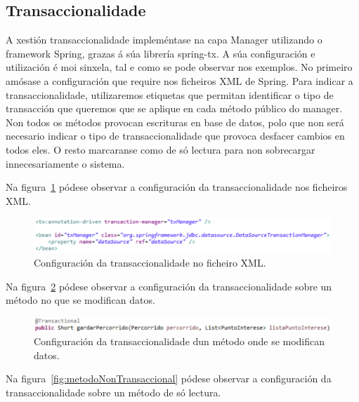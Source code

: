 \subsection{Transaccionalidade}
A xestión transaccionalidade impleméntase na capa Manager utilizando o framework Spring, grazas á súa librería spring-tx. A súa configuración e utilización é moi sinxela, tal e como se pode observar nos exemplos. No primeiro amósase a configuración que require nos ficheiros XML de Spring. Para indicar a transaccionalidade, utilizaremos etiquetas que permitan identificar o tipo de transacción que queremos que se aplique en cada método público do manager. Non todos os métodos provocan escrituras en base de datos, polo que non será necesario indicar o tipo de transaccionalidade que provoca desfacer cambios en todos eles. O resto marcaranse como de só lectura para non sobrecargar innecesariamente o sistema.

Na figura~\ref{fig:transaccionConfiguracion} pódese observar a configuración da transaccionalidade nos ficheiros XML.

\begin{figure}[tbh] 
	\begin{center}
		\includegraphics[width=1\textwidth]{figures/codigo/transaccionConfiguracion}
		\caption{Configuración da transaccionalidade no ficheiro XML.}
		\label{fig:transaccionConfiguracion}
	\end{center}
\end{figure}


Na figura~\ref{fig:metodoTransaccional} pódese observar a configuración da transaccionalidade sobre un método no que se modifican datos.

\begin{figure}[tbh] 
	\begin{center}
		\includegraphics[width=1\textwidth]{figures/codigo/metodoTransaccional}
		\caption{Configuración da transaccionalidade dun método onde se modifican datos.}
		\label{fig:metodoTransaccional}
	\end{center}
\end{figure}

Na figura~\ref{fig:metodoNonTransaccional} pódese observar a configuración da transaccionalidade sobre un método de só lectura.


